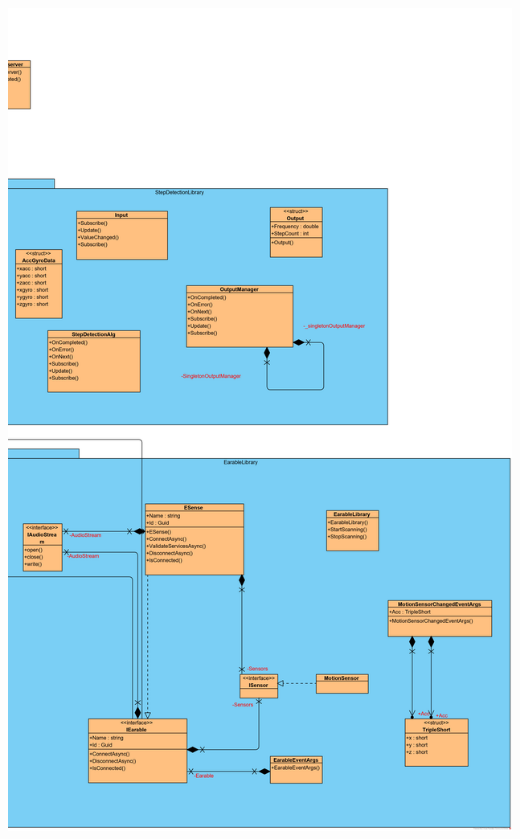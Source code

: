 \documentclass[../entwurf.tex]{subfiles}
\begin{document}
\includegraphics[scale=0.12]{../graphics/uml_diagramme/Gesamt/7.png}
\newpage
\end{document}
